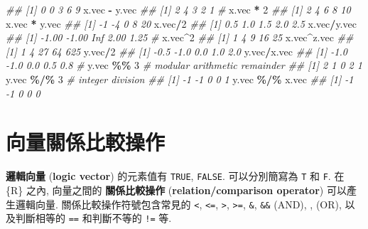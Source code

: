 \documentclass[
]{book}
\newenvironment{Shaded}{\begin{snugshade}}{\end{snugshade}}
\newcommand{\CommentTok}[1]{\textcolor[rgb]{0.56,0.35,0.01}{\textit{#1}}}
\newcommand{\DecValTok}[1]{\textcolor[rgb]{0.00,0.00,0.81}{#1}}
\newcommand{\NormalTok}[1]{#1}
\newcommand{\OperatorTok}[1]{\textcolor[rgb]{0.81,0.36,0.00}{\textbf{#1}}}
\newcommand{\StringTok}[1]{\textcolor[rgb]{0.31,0.60,0.02}{#1}}
\begin{document}
\begin{Shaded}
\begin{Highlighting}[]
\CommentTok{\#\# [1] 0 0 3 6 9}
\NormalTok{x.vec }\OperatorTok{{-}}\StringTok{ }\NormalTok{y.vec}
\CommentTok{\#\# [1] 2 4 3 2 1}
\CommentTok{\#}
\NormalTok{x.vec }\OperatorTok{*}\StringTok{ }\DecValTok{2}
\CommentTok{\#\# [1]  2  4  6  8 10}
\NormalTok{x.vec }\OperatorTok{*}\StringTok{ }\NormalTok{y.vec}
\CommentTok{\#\# [1] {-}1 {-}4  0  8 20}
\NormalTok{x.vec}\OperatorTok{/}\DecValTok{2}
\CommentTok{\#\# [1] 0.5 1.0 1.5 2.0 2.5}
\NormalTok{x.vec}\OperatorTok{/}\NormalTok{y.vec}
\CommentTok{\#\# [1] {-}1.00 {-}1.00   Inf  2.00  1.25}
\CommentTok{\#}
\NormalTok{x.vec}\OperatorTok{\^{}}\DecValTok{2}
\CommentTok{\#\# [1]  1  4  9 16 25}
\NormalTok{x.vec}\OperatorTok{\^{}}\NormalTok{z.vec}
\CommentTok{\#\# [1]   1   4  27  64 625}
\NormalTok{y.vec}\OperatorTok{/}\DecValTok{2}
\CommentTok{\#\# [1] {-}0.5 {-}1.0  0.0  1.0  2.0}
\NormalTok{y.vec}\OperatorTok{/}\NormalTok{x.vec}
\CommentTok{\#\# [1] {-}1.0 {-}1.0  0.0  0.5  0.8}
\CommentTok{\#}
\NormalTok{y.vec }\OperatorTok{\%\%}\StringTok{ }\DecValTok{3}  \CommentTok{\# modular arithmetic remainder}
\CommentTok{\#\# [1] 2 1 0 2 1}
\NormalTok{y.vec }\OperatorTok{\%/\%}\StringTok{ }\DecValTok{3}   \CommentTok{\# integer division}
\CommentTok{\#\# [1] {-}1 {-}1  0  0  1}
\NormalTok{y.vec }\OperatorTok{\%/\%}\StringTok{ }\NormalTok{x.vec}
\CommentTok{\#\# [1] {-}1 {-}1  0  0  0}
\end{Highlighting}
\end{Shaded}

\hypertarget{ux5411ux91cfux95dcux4fc2ux6bd4ux8f03ux64cdux4f5c}{%
\section{向量關係比較操作}\label{ux5411ux91cfux95dcux4fc2ux6bd4ux8f03ux64cdux4f5c}}

\textbf{邏輯向量}
(\textbf{logic vector})
的元素值有
\texttt{TRUE},
\texttt{FALSE}.
可以分別簡寫為
\texttt{T} 和
\texttt{F}.
在 \{R\} 之內, 向量之間的
\textbf{關係比較操作}
(\textbf{relation/comparison operator})
可以產生邏輯向量.
關係比較操作符號包含常見的
\texttt{\textless{}},
\texttt{\textless{}=},
\texttt{\textgreater{}},
\texttt{\textgreater{}=},
\texttt{\&}, \texttt{\&\&} (AND), \texttt{\textbar{}} , \texttt{\textbar{}\textbar{}} (OR),
以及判斷相等的
\texttt{==} 和判斷不等的
\texttt{!=} 等.
\end{document}
